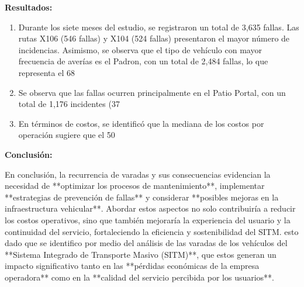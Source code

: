\documentclass[
  letterpaper,
  DIV=11,
  numbers=noendperiod]{scrartcl}
\begin{document}
\begin{@twocolumnfalse}
\textbf{Resultados:}
\begin{enumerate}
    \item Durante los siete meses del estudio, se registraron un total de 3,635 fallas. Las rutas X106 (546 fallas) y X104 (524 fallas) presentaron el mayor número de incidencias. Asimismo, se observa que el tipo de vehículo con mayor frecuencia de averías es el Padron, con un total de 2,484 fallas, lo que representa el 68%
    \item Se observa que las fallas ocurren principalmente en el Patio Portal, con un total de 1,176 incidentes (37%
    \item En términos de costos, se identificó que la mediana de los costos por operación sugiere que el 50%
\end{enumerate}

  
\textbf{Conclusión:}

En conclusión, la recurrencia de varadas y sus consecuencias evidencian la necesidad de **optimizar los procesos de mantenimiento**, implementar **estrategias de prevención de fallas** y considerar **posibles mejoras en la infraestructura vehicular**. Abordar estos aspectos no solo contribuiría a reducir los costos operativos, sino que también mejoraría la experiencia del usuario y la continuidad del servicio, fortaleciendo la eficiencia y sostenibilidad del SITM. esto dado que se identifico por medio del análisis de las varadas de los vehículos del **Sistema Integrado de Transporte Masivo (SITM)**, que estos generan un impacto significativo tanto en las **pérdidas económicas de la empresa operadora** como en la **calidad del servicio percibida por los usuarios**.  


\end{@twocolumnfalse}
\end{document}
